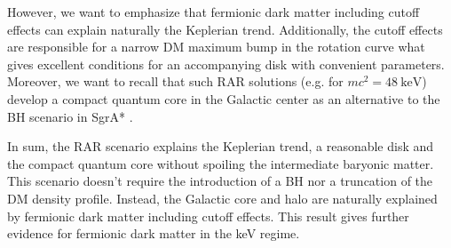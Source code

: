 However, we want to emphasize that fermionic dark matter including cutoff effects can explain naturally the Keplerian trend. Additionally, the cutoff effects are responsible for a narrow DM maximum bump in the rotation curve what gives excellent conditions for an accompanying disk with convenient parameters. Moreover, we want to recall that such RAR solutions (e.g. for $mc^2 = \SI{48}{\kilo\electronvolt}$) develop a compact quantum core in the Galactic center as an alternative to the BH scenario in SgrA* \citep{2016arXiv160607040A}.

In sum, the RAR scenario explains the Keplerian trend, a reasonable disk and the compact quantum core without spoiling the intermediate baryonic matter. This scenario doesn't require the introduction of a BH nor a truncation of the DM density profile. Instead, the Galactic core and halo are naturally explained by fermionic dark matter including cutoff effects. This result gives further evidence for fermionic dark matter in the keV regime.




